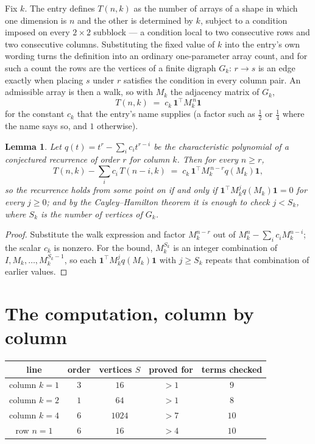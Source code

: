 \documentclass[11pt,a4paper]{article}
\theoremstyle{plain}
\newtheorem{lemma}[theorem]{Lemma}
\theoremstyle{definition}
\begin{document}
Fix $k$. The entry defines $T(n,k)$ as the number of arrays of a shape in which one dimension
is $n$ and the other is determined by $k$, subject to a condition imposed on every
$2\times2$ subblock --- a condition local to two consecutive rows and two consecutive columns.
Substituting the fixed value of $k$ into the entry's own wording turns the definition into an
ordinary one-parameter array count, and for such a count the rows are the vertices of a finite
digraph $G_k$: $r\to s$ is an edge exactly when placing $s$ under $r$ satisfies the condition
in every column pair. An admissible array is then a walk, so with $M_k$ the adjacency matrix
of $G_k$,
\[
T(n,k)\;=\;c_k\,\mathbf{1}^{\!\top}M_k^{\,n}\mathbf{1}
\]
for the constant $c_k$ that the entry's name supplies (a factor such as $\tfrac12$ or
$\tfrac14$ where the name says so, and $1$ otherwise).

\begin{lemma}\label{lem:crit}
Let $q(t)=t^{r}-\sum_i c_it^{r-i}$ be the characteristic polynomial of a conjectured
recurrence of order $r$ for column $k$. Then for every $n\ge r$,
\[
T(n,k)-\sum_i c_i\,T(n-i,k)\;=\;c_k\,\mathbf{1}^{\!\top}M_k^{\,n-r}q(M_k)\mathbf{1},
\]
so the recurrence holds from some point on if and only if
$\mathbf{1}^{\!\top}M_k^{j}q(M_k)\mathbf{1}=0$ for every $j\ge0$; and by the
Cayley--Hamilton theorem it is enough to check $j<S_k$, where $S_k$ is the number of vertices
of $G_k$.
\end{lemma}

\begin{proof}
Substitute the walk expression and factor $M_k^{n-r}$ out of $M_k^{n}-\sum_ic_iM_k^{n-i}$;
the scalar $c_k$ is nonzero. For the bound, $M_k^{S_k}$ is an integer combination of
$I,M_k,\dots,M_k^{S_k-1}$, so each $\mathbf{1}^{\!\top}M_k^{j}q(M_k)\mathbf{1}$ with
$j\ge S_k$ repeats that combination of earlier values.
\end{proof}

\section{The computation, column by column}

\begin{center}
\begin{tabular}{ccccc}
line & order & vertices $S$ & proved for & terms checked \\ \hline
column $k$$=1$ & $3$ & $16$ & $>1$ & $9$ \\
column $k$$=2$ & $1$ & $64$ & $>1$ & $8$ \\
column $k$$=4$ & $6$ & $1024$ & $>7$ & $10$ \\
row $n$$=1$ & $6$ & $16$ & $>4$ & $10$ \\
\end{tabular}
\end{center}
\end{document}
